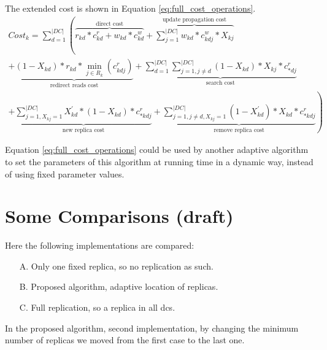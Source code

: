 \documentclass[english]{article}
\begin{document}
The extended cost is shown in Equation \ref{eq:full_cost_operations}.
\begin{equation} \label{eq:full_cost_operations}
	\begin{split}
		Cost_{k} = \sum^{|DC|}_{d = 1} \left( \overbrace{r_{kd} * c^{r}_{kd} + w_{kd} * c^{w}_{kd}}^\text{direct cost} + \overbrace{\sum^{|DC|}_{j = 1} w_{kd} * c^{w}_{kdj} * X_{kj}}^\text{update propagation cost} \right. \\ 
		+ \underbrace{(1 - X_{kd}) * r_{kd} * \min_{j \in R_{k}}(c^{r}_{kdj})}_\text{redirect reads cost} + \underbrace{\sum^{|DC|}_{d = 1}  \sum^{|DC|}_{j = 1, j \neq d}  (1 - X_{kd}) * X_{kj} * c^{r}_{*dj}}_\text{search cost} \\
		\left. + \underbrace{\sum^{|DC|}_{j = 1, X_{kj} = 1} X^{'}_{kd} * (1 - X_{kd}) * c^{r}_{*kdj}}_\text{new replica cost} + \underbrace{\sum^{|DC|}_{j = 1, j \neq d, X_{kj} = 1} (1 - X^{'}_{kd}) * X_{kd} * c^{r}_{*kdj}}_\text{remove replica cost} \right)
	\end{split}
\end{equation}

Equation \ref{eq:full_cost_operations} could be used by another adaptive algorithm to set the parameters of this algorithm at running time in a dynamic way, instead of using fixed parameter values.


\section{Some Comparisons (draft)}
Here the following implementations are compared:
\begin{itemize}
	\item[A.] Only one fixed replica, so no replication as such.
	
	\item[B.] Proposed algorithm, adaptive location of replicas.

	\item[C.] Full replication, so a replica in all \glspl{dc}.
\end{itemize}

In the proposed algorithm, second implementation, by changing the minimum number of replicas we moved from the first case to the last one.
\end{document}
